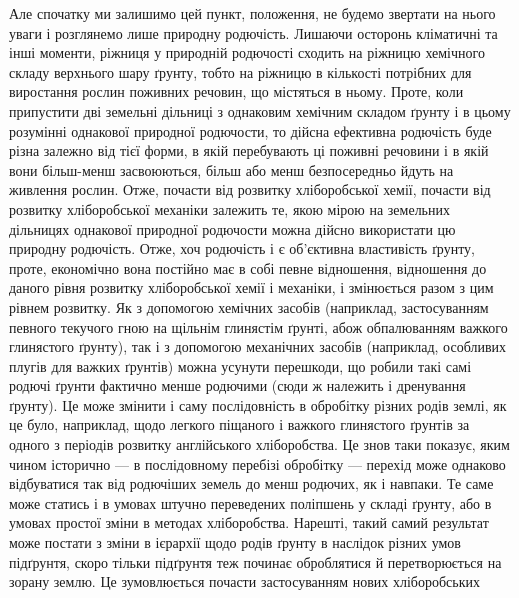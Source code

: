 Але спочатку ми залишимо цей пункт, положення, не будемо звертати на
нього уваги і розглянемо лише природну родючість. Лишаючи осторонь кліматичні
та інші моменти, ріжниця у природній родючості сходить на ріжницю
хемічного складу верхнього шару ґрунту, тобто на ріжницю в кількості потрібних
для виростання рослин поживних речовин, що містяться в ньому. Проте, коли
припустити дві земельні дільниці з однаковим хемічним складом ґрунту і в
цьому розумінні однакової природної родючости, то дійсна ефективна родючість
буде різна залежно від тієї форми, в якій перебувають ці поживні речовини і в якій
вони більш-менш засвоюються, більш або менш безпосередньо йдуть на живлення
рослин. Отже, почасти від розвитку хліборобської хемії, почасти від розвитку
хліборобської механіки залежить те, якою мірою на земельних дільницях однакової
природної родючости можна дійсно використати цю природну родючість.
Отже, хоч родючість і є об’єктивна властивість ґрунту, проте, економічно вона
постійно має в собі певне відношення, відношення до даного рівня розвитку
хліборобської хемії і механіки, і змінюється разом з цим рівнем розвитку.
Як з допомогою хемічних засобів (наприклад, застосуванням певного текучого
гною на щільнім глинястім ґрунті, абож обпалюванням важкого глинястого
ґрунту), так і з допомогою механічних засобів (наприклад, особливих
плугів для важких ґрунтів) можна усунути перешкоди, що робили такі самі
родючі ґрунти фактично менше родючими (сюди ж належить і дренування ґрунту).
Це може змінити і саму послідовність в обробітку різних родів землі, як це
було, наприклад, щодо легкого піщаного і важкого глинястого ґрунтів за одного
з періодів розвитку англійського хліборобства. Це знов таки показує, яким
чином історично — в послідовному перебізі обробітку — перехід може однаково відбуватися
так від родючіших земель до менш родючих, як і навпаки. Те саме
може статись і в умовах штучно переведених поліпшень у складі ґрунту, або
в умовах простої зміни в методах хліборобства. Нарешті, такий самий результат
може постати з зміни в ієрархії щодо родів ґрунту в наслідок різних умов
підґрунтя, скоро тільки підґрунтя теж починає оброблятися й перетворюється
на зорану землю. Це зумовлюється почасти застосуванням нових хліборобських
\parbreak{}  %
